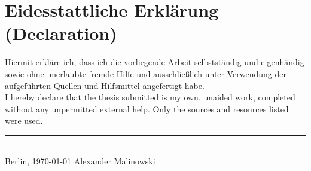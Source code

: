 \section*{Eidesstattliche Erklärung (Declaration)}

\thispagestyle{empty}
Hiermit erkläre ich, dass ich die vorliegende Arbeit selbstständig und eigenhändig sowie ohne unerlaubte fremde Hilfe und ausschließlich unter Verwendung der aufgeführten Quellen und Hilfsmittel angefertigt habe.\\

I hereby declare that the thesis submitted is my own, unaided work, completed without any unpermitted external help. Only the sources and resources listed were used.\\

\vspace{10 mm}
\begin{flushright}
    \rule{95mm}{1pt}\\
    Berlin, \today \hspace{15 mm} Alexander Malinowski
\end{flushright}
